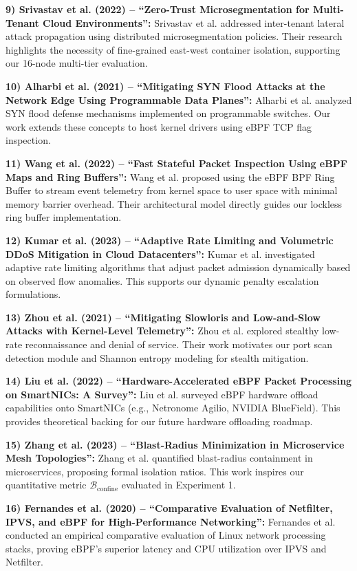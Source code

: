 \documentclass[conference]{IEEEtran}
\begin{document}
\noindent
\textbf{9) Srivastav et al. (2022) -- ``Zero-Trust Microsegmentation for Multi-Tenant Cloud Environments'':} 
Srivastav et al. addressed inter-tenant lateral attack propagation using distributed microsegmentation policies. Their research highlights the necessity of fine-grained east-west container isolation, supporting our 16-node multi-tier evaluation.

\noindent
\textbf{10) Alharbi et al. (2021) -- ``Mitigating SYN Flood Attacks at the Network Edge Using Programmable Data Planes'':} 
Alharbi et al. analyzed SYN flood defense mechanisms implemented on programmable switches. Our work extends these concepts to host kernel drivers using eBPF TCP flag inspection.

\noindent
\textbf{11) Wang et al. (2022) -- ``Fast Stateful Packet Inspection Using eBPF Maps and Ring Buffers'':} 
Wang et al. proposed using the eBPF BPF Ring Buffer to stream event telemetry from kernel space to user space with minimal memory barrier overhead. Their architectural model directly guides our lockless ring buffer implementation.

\noindent
\textbf{12) Kumar et al. (2023) -- ``Adaptive Rate Limiting and Volumetric DDoS Mitigation in Cloud Datacenters'':} 
Kumar et al. investigated adaptive rate limiting algorithms that adjust packet admission dynamically based on observed flow anomalies. This supports our dynamic penalty escalation formulations.

\noindent
\textbf{13) Zhou et al. (2021) -- ``Mitigating Slowloris and Low-and-Slow Attacks with Kernel-Level Telemetry'':} 
Zhou et al. explored stealthy low-rate reconnaissance and denial of service. Their work motivates our port scan detection module and Shannon entropy modeling for stealth mitigation.

\noindent
\textbf{14) Liu et al. (2022) -- ``Hardware-Accelerated eBPF Packet Processing on SmartNICs: A Survey'':} 
Liu et al. surveyed eBPF hardware offload capabilities onto SmartNICs (e.g., Netronome Agilio, NVIDIA BlueField). This provides theoretical backing for our future hardware offloading roadmap.

\noindent
\textbf{15) Zhang et al. (2023) -- ``Blast-Radius Minimization in Microservice Mesh Topologies'':} 
Zhang et al. quantified blast-radius containment in microservices, proposing formal isolation ratios. This work inspires our quantitative metric $\mathcal{B}_{\text{confine}}$ evaluated in Experiment 1.

\noindent
\textbf{16) Fernandes et al. (2020) -- ``Comparative Evaluation of Netfilter, IPVS, and eBPF for High-Performance Networking'':} 
Fernandes et al. conducted an empirical comparative evaluation of Linux network processing stacks, proving eBPF's superior latency and CPU utilization over IPVS and Netfilter.
\end{document}
